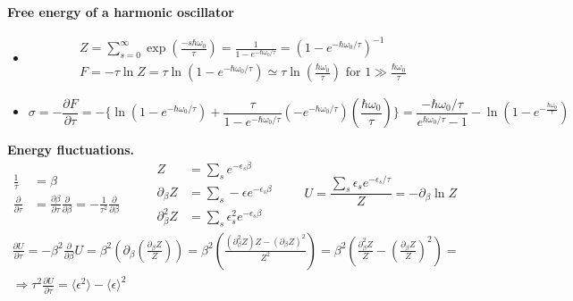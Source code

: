  \textbf{Free energy of a harmonic oscillator}  
\begin{itemize}
\item[(a)]
\[
\begin{gathered}
  Z = \sum_{s=0}^{\infty} \exp{ \left( \frac{-s \hbar \omega_0 }{\tau} \right) } = \frac{1}{ 1 - e^{-\hbar \omega_0 /\tau } } = (1 - e^{-\hbar \omega_0 /\tau} )^{-1} \\ 
  F = - \tau \ln{Z} = \tau \ln{ ( 1 - e^{-\hbar \omega_0 /\tau } ) } \simeq \tau \ln{ \left( \frac{\hbar \omega_0}{\tau } \right) } \text{ for } 1 \gg \frac{\hbar \omega_0}{\tau }
\end{gathered}
\]
\item[(b)] 
\[
\sigma = -\frac{\partial F}{\partial \tau} =  - \lbrace \ln{(1-e^{-\hbar \omega_0/\tau } ) } + \frac{\tau}{ 1 - e^{-\hbar \omega_0/\tau } } ( -e^{-\hbar \omega_0/ \tau} ) \left( \frac{\hbar \omega_0 }{\tau} \right) \rbrace = \frac{-\hbar \omega_0/\tau}{ e^{\hbar \omega_0/\tau } - 1 }  - \ln{  ( 1 - e^{-\frac{\hbar \omega_0 }{\tau } } ) }
\]
\end{itemize}





 \textbf{Energy fluctuations.}  
\[
\begin{aligned} \frac{1}{\tau} & = \beta \\ \frac{\partial}{\partial \tau } & = \frac{\partial \beta}{ \partial \tau} \frac{\partial }{ \partial \beta} = -\frac{1}{\tau^2} \frac{\partial }{ \partial \beta} \end{aligned} \quad \quad \, \begin{aligned} Z & = \sum_s e^{-\epsilon_s \beta} \\ \partial_{\beta} Z & = \sum_s -\epsilon e^{-\epsilon_s \beta } \\ \partial^2_{\beta} Z & = \sum_s \epsilon_s^2 e^{-\epsilon_s \beta} \end{aligned} \quad \quad \, U  = \frac{ \sum_s \epsilon_s e^{- \epsilon_s/\tau} }{Z } = -\partial_{\beta} \ln{Z} 
\]
\[
\begin{gathered}
  \frac{\partial U}{\partial \tau} = - \beta^2 \frac{\partial }{\partial \beta} U  = \beta^2 \left( \partial_{\beta} \left( \frac{ \partial_{\beta} Z }{ Z} \right) \right) = \beta^2 \left( \frac{ (\partial_{\beta}^2 Z )Z - (\partial_{ \beta} Z )^2 }{ Z^2} \right) = \beta^2 \left( \frac{ \partial_{\beta}^2 Z }{Z} - \left( \frac{ \partial_{\beta} Z}{Z} \right)^2 \right) = \\
  \Longrightarrow \tau^2 \frac{ \partial U}{\partial \tau} = \langle \epsilon^2 \rangle - \langle \epsilon \rangle^2
\end{gathered}
\]








